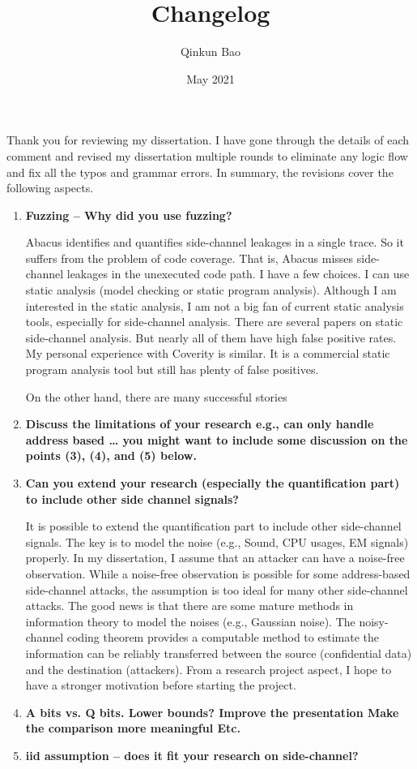 \documentclass{article}
\title{Changelog}
\author{Qinkun Bao}
\date{May 2021}
\begin{document}
\maketitle
Thank you for reviewing my dissertation. I have gone through the details of each comment and revised my dissertation multiple rounds to eliminate any logic flow and fix all the typos and grammar errors. In summary, the revisions cover the following aspects.


\begin{enumerate}
\item \textbf{Fuzzing – Why did you use fuzzing?}

Abacus identifies and quantifies side-channel leakages in a single trace. So it suffers from the problem of code coverage.  That is, Abacus misses side-channel leakages in the unexecuted code path. I have a few choices. I can use static analysis (model checking or static program analysis). Although I am interested in the static analysis, I am not a big fan of current static analysis tools, especially for side-channel analysis. There are several papers on static side-channel analysis. But nearly all of them have high false positive rates. My personal experience with Coverity is similar. It is a commercial static program analysis tool but still has plenty of false positives. 


On the other hand, there are many successful stories 

\item \textbf{Discuss the limitations of your research
e.g., can only handle address based …
you might want to include some discussion on the points (3), (4), and (5) below.}
\item \textbf{Can you extend your research (especially the quantification part) to include other side channel signals?}

It is possible to extend the quantification part to include other side-channel signals. The key is to model the noise (e.g., Sound, CPU usages, EM signals) properly. In my dissertation, I assume that an attacker can have a noise-free observation. While a noise-free observation is possible for some address-based side-channel attacks, the assumption is too ideal for many other side-channel attacks. The good news is that there are some mature methods in information theory to model the noises (e.g., Gaussian noise). The noisy-channel coding theorem provides a computable method to estimate the information can be reliably transferred between the source (confidential data) and the destination (attackers). From a research project aspect, I hope to have a stronger motivation before starting the project. 
\item \textbf{A bits vs. Q bits. Lower bounds?
       Improve the presentation
       Make the comparison more meaningful
       Etc.}
\item \textbf{iid assumption – does it fit your research on side-channel?}


\end{enumerate}
\end{document}
